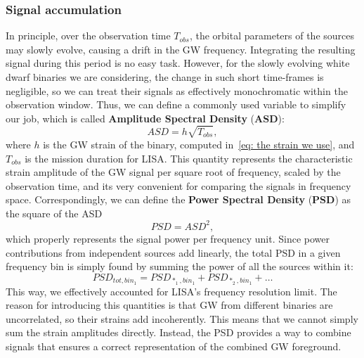 \subsubsection{Signal accumulation}
In principle, over the observation time $T_{obs}$, the orbital parameters of the sources may slowly evolve, causing a drift in the GW frequency. 
Integrating the resulting signal during this period is no easy task.
However, for the slowly evolving white dwarf binaries we are considering, the change in such short time-frames is negligible, so we can treat their signals as effectively monochromatic within the observation window. 
Thus, we can define a commonly used variable to simplify our job, which is called  \textbf{Amplitude Spectral Density} (\textbf{ASD}):
\begin{equation}
    ASD = h\sqrt{T_{obs}},
    \label{eq: ASD definition}
\end{equation}
where $h$ is the GW strain of the binary, computed in~\eqref{eq: the strain we use}, and $T_{obs}$ is the mission duration for LISA.
This quantity represents the characteristic strain amplitude of the GW signal per square root of frequency, scaled by the observation time, and its very convenient for comparing the signals in frequency space.
Correspondingly, we can define the \textbf{Power Spectral Density} (\textbf{PSD}) as the square of the ASD
\begin{equation}
    PSD = ASD^2,
    \label{eq: PSD definition}
\end{equation}
which properly represents the signal power per frequency unit.
Since power contributions from independent sources add linearly, the total PSD in a given frequency bin is simply found by summing the power of all the sources within it:
\begin{equation}
    PSD_{tot,bin_1} = PSD_{*_1,bin_1} + PSD_{*_2,bin_1} + \dots
    \label{eq: total PSD}
\end{equation}
This way, we effectively accounted for LISA's frequency resolution limit.
The reason for introducing this quantities is that GW from different binaries are uncorrelated, so their strains add incoherently. 
This means that we cannot simply sum the strain amplitudes directly.
Instead, the PSD provides a way to combine signals that ensures a correct representation of the combined GW foreground.

